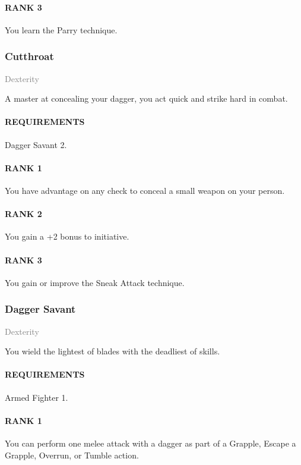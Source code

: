 \paragraph{RANK 3} You learn the Parry technique.

\subsubsection{Cutthroat} \label{feat::cutthroat}
\small{\textcolor{gray}{Dexterity}}

\normalsize
A master at concealing your dagger, you act quick and strike hard in combat.
\paragraph{REQUIREMENTS} Dagger Savant 2.
\paragraph{RANK 1} You have advantage on any check to conceal a small weapon on your person.
\paragraph{RANK 2} You gain a +2 bonus to initiative. %
\paragraph{RANK 3} You gain or improve the Sneak Attack technique.

\subsubsection{Dagger Savant} \label{feat::daggersavant}
\small{\textcolor{gray}{Dexterity}}

\normalsize
You wield the lightest of blades with the deadliest of skills.
\paragraph{REQUIREMENTS} Armed Fighter 1.
\paragraph{RANK 1} You can perform one melee attack with a dagger as part of a Grapple, Escape a Grapple, Overrun, or Tumble action.
